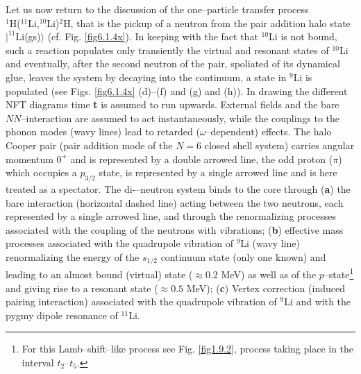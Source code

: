  Let us now return to the discussion of the one--particle transfer process\\ $^1$H($^{11}$Li,$^{10}$Li)$^2$H, that is the pickup of a neutron from the pair addition halo state $|^{11}$Li(gs)$\rangle$ (cf. Fig. \ref{fig6.1.4x}). In keeping with the fact that $^{10}$Li is not
bound, such a reaction populates only transiently the virtual and resonant states of $^{10}$Li and eventually, after the second neutron of the pair,
spoliated of its dynamical glue, leaves the system by decaying into the continuum, a state in $^{9}$Li is populated (see Figs. \ref{fig6.1.4x} (d)--(f) and  (g) and (h)). In drawing the different NFT diagrams
time \textbf{t} is assumed to run upwards. External fields and the bare $NN$--interaction are assumed to act instantaneously, while the couplings to the
phonon modes (wavy lines) lead to retarded ($\omega$--dependent) effects.  The halo Cooper pair (pair addition mode of the $N=6$
closed shell system) carries angular momentum $0^+$ and is represented by a double arrowed line, the odd proton ($\pi$) which occupies a $p_{3/2}$
state, is represented by a single arrowed line and is here treated as a spectator. The di-–neutron system binds to the core through (\textbf{a}) the bare interaction (horizontal
dashed line) acting between the two neutrons, each represented by a single arrowed line, and through the renormalizing processes associated with the coupling of the neutrons with vibrations; (\textbf{b}) effective mass processes associated with the
quadrupole vibration of $^9$Li (wavy line) renormalizing the energy of the $s_{1/2}$ continuum state (only one known) and leading to an almost bound (virtual) state
($\approx 0.2$ MeV) as well as of the $p$--state\footnote{For this Lamb--shift--like process see Fig. \ref{fig1.9.2}, process taking place in the interval $t_2$--$t_5$.} and giving rise to a resonant state ($\approx0.5$ MeV);  (\textbf{c}) Vertex correction (induced pairing interaction) associated with the quadrupole vibration of $^9$Li and with the   pygmy dipole resonance of $^{11}$Li. 

